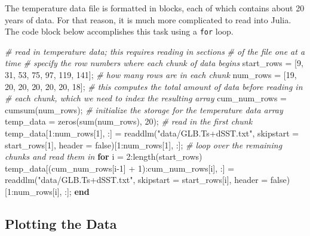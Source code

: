 \documentclass[
  11pt,
]{book}
\newenvironment{Shaded}{\begin{snugshade}}{\end{snugshade}}
\newcommand{\CommentTok}[1]{\textcolor[rgb]{0.37,0.37,0.37}{\textit{#1}}}
\newcommand{\FloatTok}[1]{\textcolor[rgb]{0.06,0.06,0.06}{#1}}
\newcommand{\KeywordTok}[1]{\textcolor[rgb]{0.27,0.27,0.27}{\textbf{#1}}}
\newcommand{\NormalTok}[1]{#1}
\newcommand{\StringTok}[1]{\textcolor[rgb]{0.5,0.5,0.5}{#1}}
\begin{document}
The temperature data file is formatted in blocks, each of which contains about 20 years of data. For that reason, it is much more complicated to read into Julia. The code block below accomplishes this task using a \texttt{for} loop.

\begin{Shaded}
\begin{Highlighting}[]
\CommentTok{# read in temperature data; this requires reading in sections }
\CommentTok{# of the file one at a time}
\CommentTok{# specify the row numbers where each chunk of data begins}
\NormalTok{start_rows = [}\FloatTok{9}\NormalTok{, }\FloatTok{31}\NormalTok{, }\FloatTok{53}\NormalTok{, }\FloatTok{75}\NormalTok{, }\FloatTok{97}\NormalTok{, }\FloatTok{119}\NormalTok{, }\FloatTok{141}\NormalTok{]; }
\CommentTok{# how many rows are in each chunk}
\NormalTok{num_rows = [}\FloatTok{19}\NormalTok{, }\FloatTok{20}\NormalTok{, }\FloatTok{20}\NormalTok{, }\FloatTok{20}\NormalTok{, }\FloatTok{20}\NormalTok{, }\FloatTok{20}\NormalTok{, }\FloatTok{18}\NormalTok{]; }
\CommentTok{# this computes the total amount of data before reading in }
\CommentTok{# each chunk, which we need to index the resulting array}
\NormalTok{cum_num_rows = cumsum(num_rows); }
\CommentTok{# initialize the storage for the temperature data array}
\NormalTok{temp_data = zeros(sum(num_rows), }\FloatTok{20}\NormalTok{); }
\CommentTok{# read in the first chunk}
\NormalTok{temp_data[}\FloatTok{1}\NormalTok{:num_rows[}\FloatTok{1}\NormalTok{], :] = readdlm(}\StringTok{"data/GLB.Ts+dSST.txt"}\NormalTok{, }
\NormalTok{    skipstart = start_rows[}\FloatTok{1}\NormalTok{], header = false)[}\FloatTok{1}\NormalTok{:num_rows[}\FloatTok{1}\NormalTok{], :]; }
\CommentTok{# loop over the remaining chunks and read them in}
\KeywordTok{for}\NormalTok{ i = }\FloatTok{2}\NormalTok{:length(start_rows)}
\NormalTok{    temp_data[(cum_num_rows[i-}\FloatTok{1}\NormalTok{] + }\FloatTok{1}\NormalTok{):cum_num_rows[i], :] = }
\NormalTok{        readdlm(}\StringTok{"data/GLB.Ts+dSST.txt"}\NormalTok{, skipstart = start_rows[i], }
\NormalTok{            header = false)[}\FloatTok{1}\NormalTok{:num_rows[i], :];}
\KeywordTok{end}
\end{Highlighting}
\end{Shaded}

\hypertarget{plotting-the-data}{%
\subsection{Plotting the Data}\label{plotting-the-data}}
\end{document}

